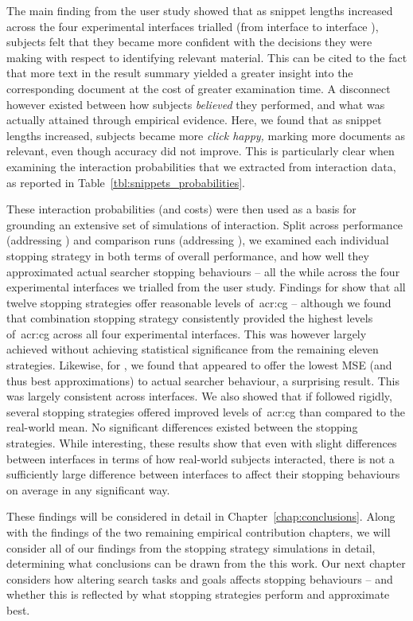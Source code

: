 The main finding from the user study showed that as snippet lengths increased across the four experimental interfaces trialled (from interface  to interface ), subjects felt that they became more confident with the decisions they were making with respect to identifying relevant material. This can be cited to the fact that more text in the result summary yielded a greater insight into the corresponding document at the cost of greater examination time. A disconnect however existed between how subjects \emph{believed} they performed, and what was actually attained through empirical evidence. Here, we found that as snippet lengths increased, subjects became more \emph{click happy,} marking more documents as relevant, even though accuracy did not improve. This is particularly clear when examining the interaction probabilities that we extracted from interaction data, as reported in Table~\ref{tbl:snippets_probabilities}.

These interaction probabilities (and costs) were then used as a basis for grounding an extensive set of simulations of interaction. Split across performance (addressing ) and comparison runs (addressing ), we examined each individual stopping strategy in both terms of overall performance, and how well they approximated actual searcher stopping behaviours -- all the while across the four experimental interfaces we trialled from the user study. Findings for  show that all twelve stopping strategies offer reasonable levels of~\gls{acr:cg} -- although we found that combination stopping strategy  consistently provided the highest levels of~\gls{acr:cg} across all four experimental interfaces. This was however largely achieved without achieving statistical significance from the remaining eleven strategies. Likewise, for , we found that  appeared to offer the lowest MSE (and thus best approximations) to actual searcher behaviour, a surprising result. This was largely consistent across interfaces. We also showed that if followed rigidly, several stopping strategies offered improved levels of~\gls{acr:cg} than compared to the real-world mean. No significant differences existed between the stopping strategies. While interesting, these results show that even with slight differences between interfaces in terms of how real-world subjects interacted, there is not a sufficiently large difference between interfaces to affect their stopping behaviours on average in any significant way.

These findings will be considered in detail in Chapter~\ref{chap:conclusions}. Along with the findings of the two remaining empirical contribution chapters, we will consider all of our findings from the stopping strategy simulations in detail, determining what conclusions can be drawn from the this work. Our next chapter considers how altering search tasks and goals affects stopping behaviours -- and whether this is reflected by what stopping strategies perform and approximate best.

\newpage
\thispagestyle{empty}
\mbox{}